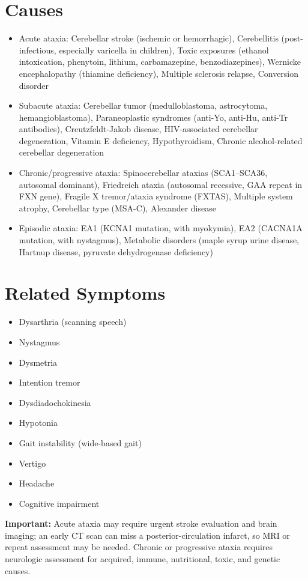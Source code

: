 \section*{Causes}
\begin{itemize}
 \item Acute ataxia: Cerebellar stroke (ischemic or hemorrhagic), Cerebellitis (post-infectious, especially varicella in children), Toxic exposures (ethanol intoxication, phenytoin, lithium, carbamazepine, benzodiazepines), Wernicke encephalopathy (thiamine deficiency), Multiple sclerosis relapse, Conversion disorder
 \item Subacute ataxia: Cerebellar tumor (medulloblastoma, astrocytoma, hemangioblastoma), Paraneoplastic syndromes (anti-Yo, anti-Hu, anti-Tr antibodies), Creutzfeldt-Jakob disease, HIV-associated cerebellar degeneration, Vitamin E deficiency, Hypothyroidism, Chronic alcohol-related cerebellar degeneration
 \item Chronic/progressive ataxia: Spinocerebellar ataxias (SCA1--SCA36, autosomal dominant), Friedreich ataxia (autosomal recessive, GAA repeat in FXN gene), Fragile X tremor/ataxia syndrome (FXTAS), Multiple system atrophy, Cerebellar type (MSA-C), Alexander disease
 \item Episodic ataxia: EA1 (KCNA1 mutation, with myokymia), EA2 (CACNA1A mutation, with nystagmus), Metabolic disorders (maple syrup urine disease, Hartnup disease, pyruvate dehydrogenase deficiency)
\end{itemize}

\section*{Related Symptoms}
\begin{itemize}
 \item Dysarthria (scanning speech)
 \item Nystagmus
 \item Dysmetria
 \item Intention tremor
 \item Dysdiadochokinesia
 \item Hypotonia
 \item Gait instability (wide-based gait)
 \item Vertigo
 \item Headache
 \item Cognitive impairment
\end{itemize}
\textbf{Important:} Acute ataxia may require urgent stroke evaluation and brain imaging; an early CT scan can miss a posterior-circulation infarct, so MRI or repeat assessment may be needed. Chronic or progressive ataxia requires neurologic assessment for acquired, immune, nutritional, toxic, and genetic causes.

